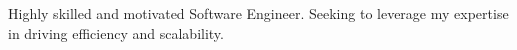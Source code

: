 

Highly skilled and motivated Software Engineer. Seeking to leverage my expertise in driving efficiency and scalability.